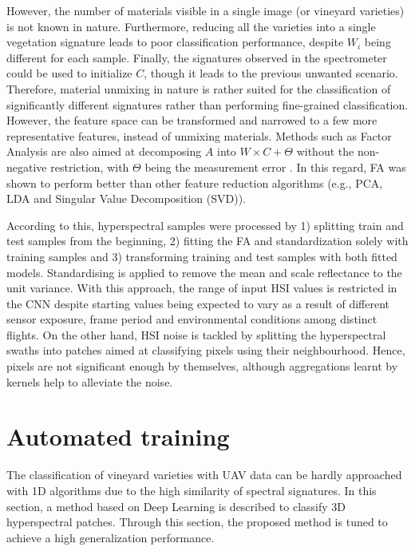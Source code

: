 However, the number of materials visible in a single image (or vineyard varieties) is not known in nature. Furthermore, reducing all the varieties into a single vegetation signature leads to poor classification performance, despite $W_i$ being different for each sample. Finally, the signatures observed in the spectrometer could be used to initialize $C$, though it leads to the previous unwanted scenario. Therefore, material unmixing in nature is rather suited for the classification of significantly different signatures rather than performing fine-grained classification. However, the feature space can be transformed and narrowed to a few more representative features, instead of unmixing materials. Methods such as Factor Analysis are also aimed at decomposing $A$ into $W \times C + \Theta$ without the non-negative restriction, with $\Theta$ being the measurement error \cite{bandalos_measurement_2018}. In this regard, FA was shown to perform better than other feature reduction algorithms (e.g., PCA, LDA and Singular Value Decomposition (SVD)).

According to this, hyperspectral samples were processed by 1) splitting train and test samples from the beginning, 2) fitting the FA and standardization solely with training samples and 3) transforming training and test samples with both fitted models. Standardising is applied to remove the mean and scale reflectance to the unit variance. With this approach, the range of input HSI values is restricted in the CNN despite starting values being expected to vary as a result of different sensor exposure, frame period and environmental conditions among distinct flights. On the other hand, HSI noise is tackled by splitting the hyperspectral swaths into patches aimed at classifying pixels using their neighbourhood. Hence, pixels are not significant enough by themselves, although aggregations learnt by kernels help to alleviate the noise.

\section{Automated training}

The classification of vineyard varieties with UAV data can be hardly approached with 1D algorithms due to the high similarity of spectral signatures. In this section, a method based on Deep Learning is described to classify 3D hyperspectral patches. Through this section, the proposed method is tuned to achieve a high generalization performance. 

